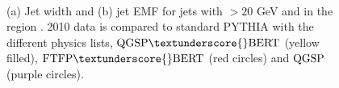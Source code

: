 \begin{figure}
\centering
\mbox{
              \quad
              \quad
}
\caption[]{(a) Jet width and (b) jet EMF for jets with \pt{}$>20$ GeV and in the region .
2010 data is compared to standard PYTHIA with the different physics lists, $\rm QGSP\textunderscore{}BERT$ (yellow filled), $\rm FTFP\textunderscore{}BERT$ (red circles) and $\rm QGSP$ (purple circles).  
\label{JetPerf:Width_EMF}}
\end{figure}

